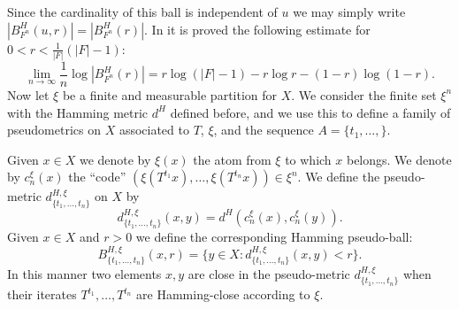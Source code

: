\documentclass[a4paper,oneside]{amsart}
\renewcommand{\(}{\begin{dmath*}}
\renewcommand{\)}{\end{dmath*}}
\theoremstyle{definition}
\begin{document}
    Since  the cardinality of this ball is independent of $u$ we may simply write $|B^H_{F^n}(u,r)|=|B^H_{F^n}(r)|$. In \cite[Equation 1.3]{katok_lyapunov_1980} it is proved the following estimate for $0<r<\frac{1}{|F|}(|F|-1)$:  \begin{equation}\label{estimate-for-cardinality-of-hamming-balls}
    \lim_{n\to\infty}\frac{1}{n}\log|B^H_{F^n}(r)|=r\log(|F|-1)-r\log r-(1-r)\log(1-r).
    \end{equation}
Now let $\xi$ be a finite and measurable partition for $X$. We consider the finite set $\xi^n$ with the Hamming metric $d^H$ defined before, and we use this to define a family of pseudometrics on $X$ associated to $T$,  $\xi$,  and the sequence $A=\{t_1,\dots,\}$. 

Given $x\in X$ we denote by  $\xi(x)$  the atom from $\xi$ to which $x$ belongs. We denote by $c^\xi_n(x)$ the ``code'' $(\xi(T^{t_1}x),\dots,\xi(T^{t_n} x))\in\xi^n$. We define the pseudo-metric $d^{H,\xi}_{\{t_1,\dots,t_n\}}$ on $X$  by \[d^{H,\xi}_{\{t_1,\dots,t_n\}}(x,y)=d^H(c^\xi_n(x),c^\xi_n(y)).\] 
    Given $x\in X$ and $r>0$ we define the corresponding Hamming pseudo-ball:
    \[B^{H,\xi}_{\{t_1,\dots,t_n\}}(x,r)=\{y\in X : d^{H,\xi}_{\{t_1,\dots,t_n\}}(x,y)<r\}.\]
    In this manner two elements $x,y$ are close in the pseudo-metric $d^{H,\xi}_{\{t_1,\dots,t_n\}}$ when their iterates $T^{t_1},\dots,T^{t_n}$ are Hamming-close according to $\xi$. 
\end{document}
